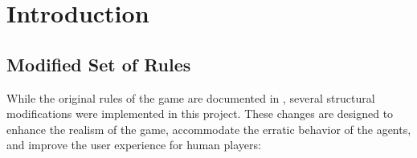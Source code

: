 \section{Introduction}
\label{sec:intro}
\subsection{Modified Set of Rules}
\label{subsec:modifiedRules}

While the original rules of the game are documented in \cite{mafia_wiki}, several structural modifications were implemented in this project. 
These changes are designed to enhance the realism of the game, accommodate the erratic behavior of the agents, and improve the user experience for human players:

